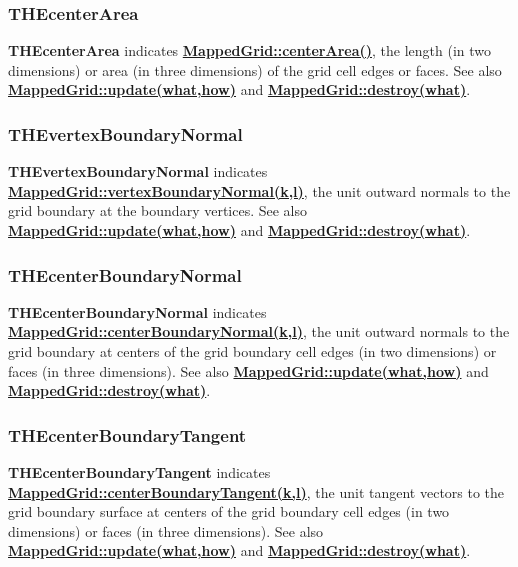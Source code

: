 \documentclass{article}
\begin{document}
  \subsubsection{THEcenterArea}
  \label{MappedGrid::THEcenterArea}
    \textbf{THEcenterArea} indicates {\bf{}\hyperref{centerArea()}{centerArea() \rm(\S}{)}{MappedGrid::centerArea()}},
    the length (in two dimensions) or area (in three dimensions) of the grid cell edges or faces.
    See also {\bf{}\hyperref{update(what,how)}{update(what,how) \rm(\S}{)}{MappedGrid::update(what,how)}}
    and {\bf{}\hyperref{destroy(what)}{destroy(what) \rm(\S}{)}{MappedGrid::destroy(what)}}.

  \subsubsection{THEvertexBoundaryNormal}
  \label{MappedGrid::THEvertexBoundaryNormal}
    \textbf{THEvertexBoundaryNormal} indicates {\bf{}\hyperref{vertexBoundaryNormal}{vertexBoundaryNormal \rm(\S}{)}{MappedGrid::vertexBoundaryNormal(k,l)}},
    the unit outward normals to the grid boundary at the boundary vertices.
    See also {\bf{}\hyperref{update(what,how)}{update(what,how) \rm(\S}{)}{MappedGrid::update(what,how)}}
    and {\bf{}\hyperref{destroy(what)}{destroy(what) \rm(\S}{)}{MappedGrid::destroy(what)}}.

  \subsubsection{THEcenterBoundaryNormal}
  \label{MappedGrid::THEcenterBoundaryNormal}
    \textbf{THEcenterBoundaryNormal} indicates {\bf{}\hyperref{centerBoundaryNormal}{centerBoundaryNormal \rm(\S}{)}{MappedGrid::centerBoundaryNormal(k,l)}},
    the unit outward normals to the grid boundary at centers of the grid boundary cell
    edges (in two dimensions) or faces (in three dimensions).
    See also {\bf{}\hyperref{update(what,how)}{update(what,how) \rm(\S}{)}{MappedGrid::update(what,how)}}
    and {\bf{}\hyperref{destroy(what)}{destroy(what) \rm(\S}{)}{MappedGrid::destroy(what)}}.

  \subsubsection{THEcenterBoundaryTangent}
  \label{MappedGrid::THEcenterBoundaryTangent}
    \textbf{THEcenterBoundaryTangent} indicates {\bf{}\hyperref{centerBoundaryTangent}{centerBoundaryTangent \rm(\S}{)}{MappedGrid::centerBoundaryTangent(k,l)}},
    the unit tangent vectors to the grid boundary surface at centers of the grid boundary cell
    edges (in two dimensions) or faces (in three dimensions).
    See also {\bf{}\hyperref{update(what,how)}{update(what,how) \rm(\S}{)}{MappedGrid::update(what,how)}}
    and {\bf{}\hyperref{destroy(what)}{destroy(what) \rm(\S}{)}{MappedGrid::destroy(what)}}.
\end{document}
